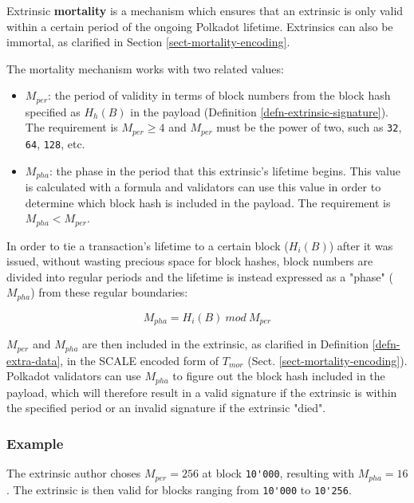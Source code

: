 \begin{definition}
    \label{defn-extrinsic-mortality}
    Extrinsic \textbf{mortality} is a mechanism which ensures that an extrinsic
    is only valid within a certain period of the ongoing Polkadot lifetime.
    Extrinsics can also be immortal, as clarified in Section
    \ref{sect-mortality-encoding}.
    \newline

    The mortality mechanism works with two related values:

    \begin{itemize}
        \item $M_{per}$: the period of validity in terms of block numbers from
        the block hash specified as $H_h(B)$ in the payload (Definition
        \ref{defn-extrinsic-signature}). The requirement is $M_{per} \geq 4$ and
        $M_{per}$ must be the power of two, such as \verb|32|, \verb|64|,
        \verb|128|, etc.
        \item $M_{pha}$: the phase in the period that this extrinsic's lifetime
        begins. This value is calculated with a formula and validators can use
        this value in order to determine which block hash is included in the
        payload. The requirement is $M_{pha} < M_{per}$.
    \end{itemize}

    In order to tie a transaction's lifetime to a certain block ($H_i(B)$) after
    it was issued, without wasting precious space for block hashes, block
    numbers are divided into regular periods and the lifetime is instead
    expressed as a "phase" ($M_{pha}$) from these regular boundaries:

    \[
        M_{pha} = H_i(B)\ mod\ M_{per}
    \]

    $M_{per}$ and $M_{pha}$ are then included in the extrinsic, as clarified in
    Definition \ref{defn-extra-data}, in the SCALE encoded form of $T_{mor}$ (Sect.
    \ref{sect-mortality-encoding}). Polkadot validators can use $M_{pha}$
    to figure out the block hash included in the payload, which will therefore
    result in a valid signature if the extrinsic is within the specified period 
    or an invalid signature if the extrinsic "died".

    \subsubsection*{Example}

    The extrinsic author choses $M_{per} = 256$ at block \verb|10'000|,
    resulting with $M_{pha} = 16$. The extrinsic is then valid for blocks
    ranging from \verb|10'000| to \verb|10'256|.


\end{definition}
